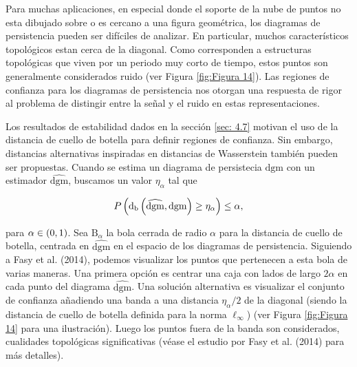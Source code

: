 Para muchas aplicaciones,
en especial donde el soporte de la nube de puntos no esta dibujado sobre o es cercano a una figura geom\'etrica,
los diagramas de persistencia pueden ser dif\'iciles de analizar.
En particular, muchos caracter\'isticos topol\'ogicos estan cerca de la diagonal.
Como corresponden  a estructuras topol\'ogicas que viven por un periodo muy corto de tiempo,
estos puntos son generalmente considerados ruido (ver Figura \ref{fig:Figura 14}).
Las regiones de confianza para los diagramas de persistencia nos otorgan una respuesta
de rigor al problema de distingir entre la se\~{n}al y el ruido en estas representaciones.

Los resultados de estabilidad dados en la secci\'on \ref{sec: 4.7}
motivan el uso de la distancia de cuello de botella para definir regiones de confianza.
Sin embargo, distancias alternativas inspiradas en distancias de Wasserstein tambi\'en pueden ser propuestas.
Cuando se estima un diagrama de persistecia $\mathrm{dgm}$ con un estimador $\widehat{\mathrm{dgm}}$,
buscamos un valor $\eta_{\alpha}$ tal que

\begin{equation*}
    P\left(\mathrm{d}_{\mathrm{b}}\left(\widehat{\mathrm{dgm}},\mathrm{dgm}\right)\geq\eta_{\alpha}\right)\leq\alpha,
\end{equation*}

para $\alpha\in\left(0,1\right)$. Sea $\mathrm{B}_{\alpha}$ la bola cerrada de radio $\alpha$
para la distancia de cuello de botella, centrada en $\widehat{\mathrm{dgm}}$ en el espacio
de los diagramas de persistencia. Siguiendo a Fasy et al. (2014)\cite{Fasy2014b},
podemos visualizar los puntos que pertenecen a esta bola de varias maneras.
Una primera opci\'on es centrar una caja con lados de largo $2\alpha$
en cada punto del diagrama $\widehat{\mathrm{dgm}}$.
Una soluci\'on alternativa es visualizar el conjunto de confianza
a\~{n}adiendo una banda a una distancia $\eta_{\alpha}/2$ de la diagonal
(siendo la distancia de cuello de botella definida para la norma $\ell_{\infty}$)
(ver Figura \ref{fig:Figura 14} para una ilustraci\'on).
Luego los puntos fuera de la banda son considerados, cualidades topol\'ogicas significativas
(v\'ease el estudio por Fasy et al. (2014)\cite{Fasy2014b} para m\'as detalles).

